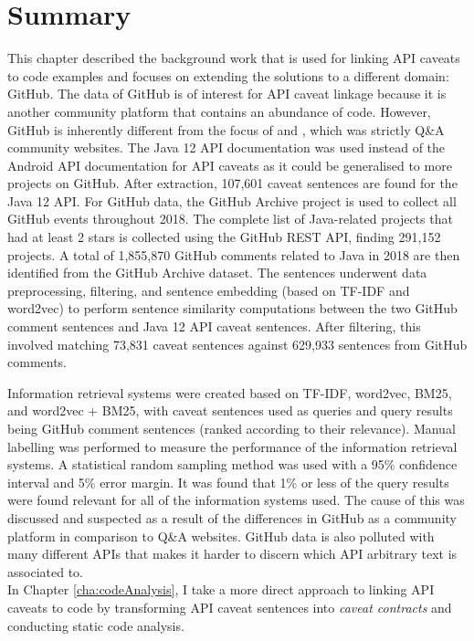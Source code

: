 \section{Summary}
\label{sec:info-summary}
This chapter described the background work that is used for linking API caveats to code examples and focuses on extending the solutions to a different domain: GitHub. The data of GitHub is of interest for API caveat linkage because it is another community platform that contains an abundance of code. However, GitHub is inherently different from the focus of \cite{jiamou} and \cite{xiaoxue}, which was strictly Q\&A community websites. The Java 12 API documentation was used instead of the Android API documentation for API caveats as it could be generalised to more projects on GitHub. After extraction, 107,601
caveat sentences are found for the Java 12 API. For GitHub data, the GitHub Archive project is used to collect all GitHub events throughout 2018. The complete list of Java-related projects that had at least 2 stars is collected using the GitHub REST API, finding 291,152 projects. A total of 1,855,870 GitHub comments related to Java in 2018 are then identified from the GitHub Archive dataset. The sentences underwent data preprocessing, filtering, and sentence embedding (based on TF-IDF and word2vec) to perform sentence similarity computations between the two GitHub comment sentences and Java 12 API caveat sentences. After filtering, this involved matching 73,831 caveat sentences against 629,933 sentences from GitHub comments. \bigbreak

Information retrieval systems were created based on TF-IDF, word2vec, BM25, and word2vec + BM25, with caveat sentences used as queries and query results being GitHub comment sentences (ranked according to their relevance). Manual labelling was performed to measure the performance of the information retrieval systems. A statistical random sampling method was used with a 95\% confidence interval and 5\% error margin. It was found that 1\% or less of the query results were found relevant for all of the information systems used. The cause of this was discussed and suspected as a result of the differences in GitHub as a community platform in comparison to Q\&A websites. GitHub data is also polluted with many different APIs that makes it harder to discern which API arbitrary text is associated to.\\
In Chapter \ref{cha:codeAnalysis}, I take a more direct approach to linking API caveats to code by transforming API caveat sentences into \textit{caveat contracts} and conducting static code analysis.
